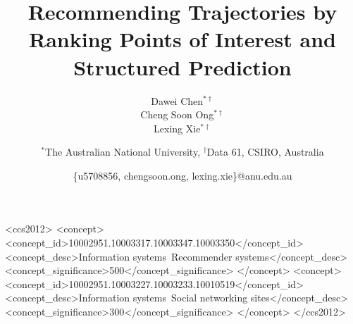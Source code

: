 \documentclass{sig-alternate-05-2015}
\begin{document}

\title{Recommending Trajectories by Ranking Points of Interest and Structured Prediction}

\author{
    \alignauthor Dawei Chen$^{*\dagger}$\\
    \alignauthor Cheng Soon Ong$^{*\dagger}$\\
    \alignauthor Lexing Xie$^{*\dagger}$\\
    \and
    $^*$The Australian National University, $^\dagger$Data 61, CSIRO, Australia\\
    \and
    \{u5708856, chengsoon.ong, lexing.xie\}@anu.edu.au
}

\maketitle

\begin{abstract}

\end{abstract}

\begin{CCSXML}
    <ccs2012>
    <concept>
    <concept_id>10002951.10003317.10003347.10003350</concept_id>
    <concept_desc>Information systems~Recommender systems</concept_desc>
    <concept_significance>500</concept_significance>
    </concept>
    <concept>
    <concept_id>10002951.10003227.10003233.10010519</concept_id>
    <concept_desc>Information systems~Social networking sites</concept_desc>
    <concept_significance>300</concept_significance>
    </concept>
    </ccs2012>
\end{CCSXML}
\printccsdesc












\end{document}
